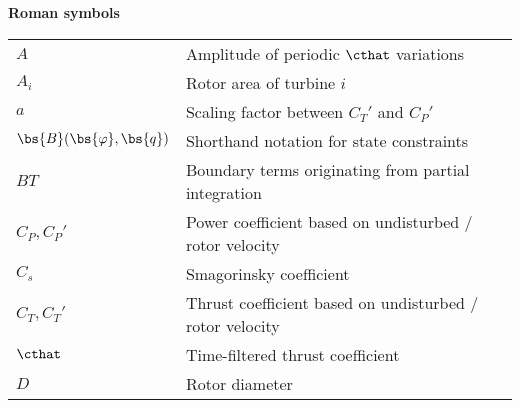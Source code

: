 \textbf{Roman symbols}

\begin{tabular}{ p{2cm}  l }
	$A$   		& Amplitude of periodic $\cthat$ variations\\
	$A_i$       & Rotor area of turbine $i$\\
	$a$   	    & Scaling factor between $C_T'$ and $C_P'$\\
	$\bs{B}(\bs{\varphi}, \bs{q})$ & Shorthand notation for state constraints\\
	$BT$	    & Boundary terms originating from partial integration\\
	$C_P, C_P'$ & Power coefficient based on undisturbed / rotor velocity\\
	$C_s$ 		& Smagorinsky coefficient\\
	$C_T, C_T'$ & Thrust coefficient based on undisturbed / rotor velocity\\
	$\cthat$    & Time-filtered thrust coefficient\\
	$D$			& Rotor diameter\\
\end{tabular}


